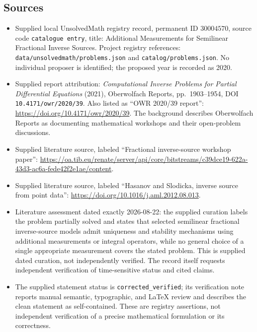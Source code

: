 \documentclass[11pt]{article}
\begin{document}
\subsection{Sources}
\begin{itemize}
\item Supplied local UnsolvedMath registry record, permanent ID \(30004570\), source code \texttt{catalogue entry}, title: Additional Measurements for Semilinear Fractional Inverse Sources. Project registry references: \texttt{data/unsolvedmath/problems.json} and \texttt{catalog/problems.json}. No individual proposer is identified; the proposed year is recorded as 2020.
\item Supplied report attribution: \emph{Computational Inverse Problems for Partial Differential Equations} (2021), Oberwolfach Reports, pp.\ 1903--1954, DOI \texttt{10.4171/owr/2020/39}. Also listed as ``OWR 2020/39 report'': \url{https://doi.org/10.4171/owr/2020/39}. The background describes Oberwolfach Reports as documenting mathematical workshops and their open-problem discussions.
\item Supplied literature source, labeled ``Fractional inverse-source workshop paper'': \url{https://oa.tib.eu/renate/server/api/core/bitstreams/c39dce19-622a-43d3-ac6a-fede42f2e1ae/content}.
\item Supplied literature source, labeled ``Hasanov and Slodicka, inverse source from point data'': \url{https://doi.org/10.1016/j.aml.2012.08.013}.
\item Literature assessment dated exactly 2026-08-22: the supplied curation labels the problem partially solved and states that selected semilinear fractional inverse-source models admit uniqueness and stability mechanisms using additional measurements or integral operators, while no general choice of a single appropriate measurement covers the stated problem. This is supplied dated curation, not independently verified. The record itself requests independent verification of time-sensitive status and cited claims.
\item The supplied statement status is \texttt{corrected\_verified}; its verification note reports manual semantic, typographic, and LaTeX review and describes the clean statement as self-contained. These are registry assertions, not independent verification of a precise mathematical formulation or its correctness.
\end{itemize}
\end{document}
